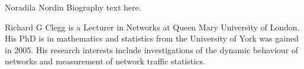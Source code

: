 \documentclass[journal]{IEEEtran}
\begin{document}
\ifCLASSOPTIONcaptionsoff
  \newpage
\fi





%
%
%




% 

\begin{IEEEbiography}{Noradila Nordin}
Biography text here.
\end{IEEEbiography}

\begin{IEEEbiography}{Richard G Clegg}
is a Lecturer in Networks at Queen Mary University of London. His PhD is in mathematics and statistics from the University of York was gained in 2005. His research interests include investigations of the dynamic behaviour of networks and measurement of network traffic statistics.
\end{IEEEbiography}
\end{document}
